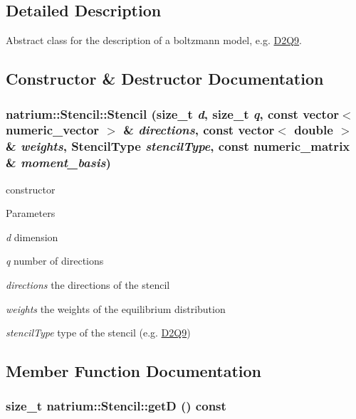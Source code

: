 \subsection{Detailed Description}
Abstract class for the description of a boltzmann model, e.g. \hyperlink{classnatrium_1_1D2Q9}{D2Q9}. 

\subsection{Constructor \& Destructor Documentation}
\hypertarget{classnatrium_1_1Stencil_ac521a427aca04be5a4962f3f23e17cd5}{
\subsubsection[{Stencil}]{\setlength{\rightskip}{0pt plus 5cm}natrium::Stencil::Stencil (size\_\-t {\em d}, \/  size\_\-t {\em q}, \/  const vector$<$ {\bf numeric\_\-vector} $>$ \& {\em directions}, \/  const vector$<$ double $>$ \& {\em weights}, \/  {\bf StencilType} {\em stencilType}, \/  const {\bf numeric\_\-matrix} \& {\em moment\_\-basis})}}
\label{classnatrium_1_1Stencil_ac521a427aca04be5a4962f3f23e17cd5}


constructor 
\begin{DoxyParams}{Parameters}
\item[{\em d}]dimension \item[{\em q}]number of directions \item[{\em directions}]the directions of the stencil \item[{\em weights}]the weights of the equilibrium distribution \item[{\em stencilType}]type of the stencil (e.g. \hyperlink{classnatrium_1_1D2Q9}{D2Q9}) \end{DoxyParams}


\subsection{Member Function Documentation}
\hypertarget{classnatrium_1_1Stencil_a55ee00e8c03b266c7eeed3964d2c93bf}{
\subsubsection[{getD}]{\setlength{\rightskip}{0pt plus 5cm}size\_\-t natrium::Stencil::getD () const}}
\label{classnatrium_1_1Stencil_a55ee00e8c03b266c7eeed3964d2c93bf}


